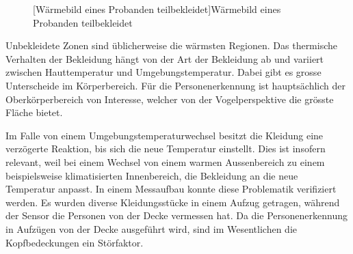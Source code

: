 \begin{figure}[!ht]
\begin{minipage}[b]{0.45\linewidth}
		[Wärmebild eines Probanden teilbekleidet]{Wärmebild eines Probanden teilbekleidet}
		\label{fig:Waermebild2}	
	\end{minipage}
\end{figure}

 Unbekleidete Zonen sind üblicherweise die wärmsten Regionen. Das thermische Verhalten der Bekleidung hängt von der Art der Bekleidung ab und variiert zwischen Hauttemperatur und Umgebungstemperatur. Dabei gibt es grosse Unterscheide im Körperbereich. Für die Personenerkennung ist hauptsächlich der Oberkörperbereich von Interesse, welcher von der Vogelperspektive die grösste Fläche bietet.
 
 Im Falle von einem Umgebungstemperaturwechsel besitzt die Kleidung eine verzögerte Reaktion, bis sich die neue Temperatur einstellt. 
 Dies ist insofern relevant, weil bei einem Wechsel von einem warmen Aussenbereich zu einem beispielsweise klimatisierten Innenbereich, die Bekleidung an die neue Temperatur anpasst. In einem Messaufbau konnte diese Problematik verifiziert werden. Es wurden diverse Kleidungsstücke in einem Aufzug getragen, während der Sensor die Personen von der Decke vermessen hat. Da die Personenerkennung in Aufzügen von der Decke ausgeführt wird, sind im Wesentlichen die Kopfbedeckungen ein Störfaktor.

